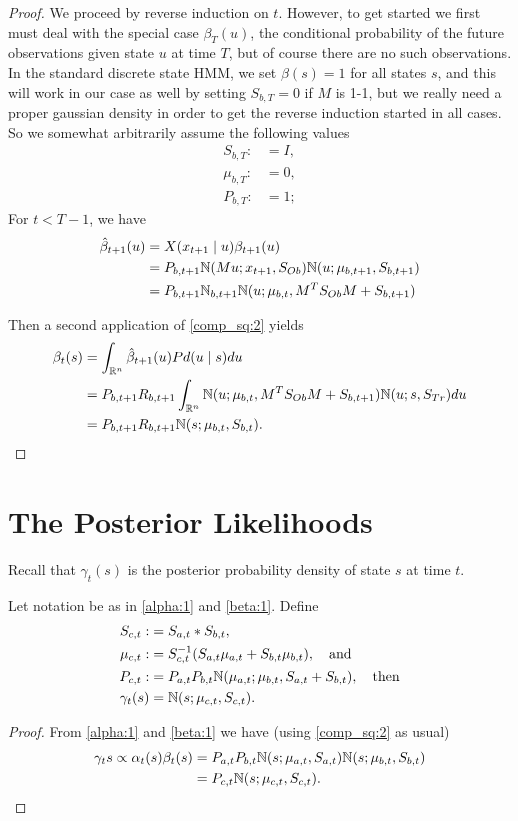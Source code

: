 \documentclass[12pt,leqno]{article}
\begin{document}
\begin{proof}
We proceed by reverse induction on $t$. However, to get started we first must  deal with
the special case $\beta_{T}(u)$, the conditional probability of the future observations given
state $u$ at time $T$, but of course there are no such observations.  In the standard discrete
state HMM, we set $\beta(s) = 1$ for all states $s$, and this will work in our case as well by
setting $S_{b,T} = 0$ if $M$ is 1-1, but we really need a proper gaussian 
density in order to get the reverse induction started in all cases.  So we somewhat arbitrarily
assume the following values
\begin{align*}
  S_{b,T} :&= I,\\
  \mu_{b,T} :&= 0,\\
  P_{b,T} :&= 1;
\end{align*}
  For $t <  T-1$, we have 
  \begin{align*}
    \hat{\beta}_{t+1}(u) &= X(x_{t+1}\mid u)\beta_{t+1}(u)\\
    &= P_{b,t+1}{\mathbb N}(Mu;x_{t+1},S_{Ob}){\mathbb N}(u;\mu_{b,t+1},S_{b,t+1})\\
    &= P_{b,t+1}{\mathbb N}_{b,t+1}{\mathbb N}(u;\mu_{b,t},M^TS_{Ob}M+S_{b,t+1})
  \end{align*}

  Then a second application of \eqref{comp_sq:2} yields
  \begin{align*}
    \beta_t(s) &= \int_{{\mathbb R}^n}\hat{\beta}_{t+1}(u)Pd(u\mid s)du \\
    &= P_{b,t+1}R_{b,t+1}\int_{{\mathbb R}^n}{\mathbb N}(u;\mu_{b,t},M^TS_{Ob}M + S_{b,t+1}){\mathbb N}(u;s,S_{Tr})du\\
    &=P_{b,t+1}R_{b,t+1}{\mathbb N}(s;\mu_{b,t},S_{b,t}).
  \end{align*}
\end{proof}

\section{The Posterior Likelihoods}
Recall that $\gamma_t(s)$ is the posterior probability density of state $s$
at time $t$. 
\begin{Thm}
  Let notation be as in \eqref{alpha:1} and \eqref{beta:1}.  Define
\begin{align*}
  S_{c,t} :&= S_{a,t}*S_{b,t}, \\
  \mu_{c,t} :&= S_{c,t}^{-1}(S_{a,t}\mu_{a,t} + S_{b,t}\mu_{b,t}), \quad\text{and}\\
  P_{c,t} :&= P_{a,t}P_{b,t}{\mathbb N}(\mu_{a,t};\mu_{b,t},S_{a,t}+S_{b,t}), \quad\text{then} \\
 \gamma_t(s) &= {\mathbb N}(s;\mu_{c,t},S_{c,t}).
  \end{align*}
\end{Thm}
\begin{proof}
  From \eqref{alpha:1} and \eqref{beta:1} we have (using \eqref{comp_sq:2}
  as usual)
  \begin{align*}
  \gamma_t{s} \propto \alpha_t(s)\beta_t(s) &= P_{a,t}P_{b,t}{\mathbb N}(s;\mu_{a,t},S_{a,t}){\mathbb N}(s;\mu_{b,t},S_{b,t})\\
  &= P_{c,t}{\mathbb N}(s;\mu_{c,t},S_{c,t}).
  \end{align*}
\end{proof}
\end{document}
